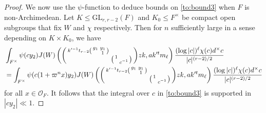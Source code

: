 \documentclass[12pt]{amsart}
\theoremstyle{remark}
\numberwithin{equation}{section}
\newcommand{\GL}{\mathrm{GL}}
\newcommand{\OO}{\mathcal{O}}
\theoremstyle{definition}
\newenvironment{psmatrix}
  {\left(\begin{smallmatrix}}
  {\end{smallmatrix}\right)}
\numberwithin{equation}{subsection}
\begin{document}
\begin{proof}
We now use the $\psi$-function to deduce bounds on \eqref{to:bound3} when $F$ is non-Archimedean. Let $K\le \GL_{r,r-2}(F)$ and $K_0\le F^\times$ be compact open subgroups that fix $W$ and $\chi$ respectively.  Then for $n$ sufficiently large in a sense depending on $K \times K_0$, we have 
\begin{align*} \begin{split}
    &\int_{F^\times}\psi(cy_2)
J(W)\left(\begin{psmatrix}k'^{-1}t_{r-2}\begin{psmatrix}  g_1 &  y_1 \\ & 1 \end{psmatrix}& \\ &  \begin{psmatrix} 1 &  \\ & c^{-1} \end{psmatrix} \end{psmatrix}zk,ak'^tm_\ell \right)
\frac{(\log|c|)^\ell\chi(c) d^\times c}{|c|^{(r-2)/2}}\\
&=\int_{F^\times}\psi(c(1+\varpi^n x)y_2)
J(W)\left(\begin{psmatrix}k'^{-1}t_{r-2}\begin{psmatrix}  g_1 &  y_1 \\ & 1\end{psmatrix}& \\ &  \begin{psmatrix} 1 &  \\ & c^{-1} \end{psmatrix} \end{psmatrix}zk,ak'^tm_\ell \right)
\frac{(\log|c|)^\ell\chi(c) d^\times c}{|c|^{(r-2)/2}} \end{split}
\end{align*}
for all $x \in \OO_F.$  It follows that the integral over $c$ in \eqref{to:bound3} is supported in $|cy_2| \ll 1.$


\end{proof}
\end{document}
